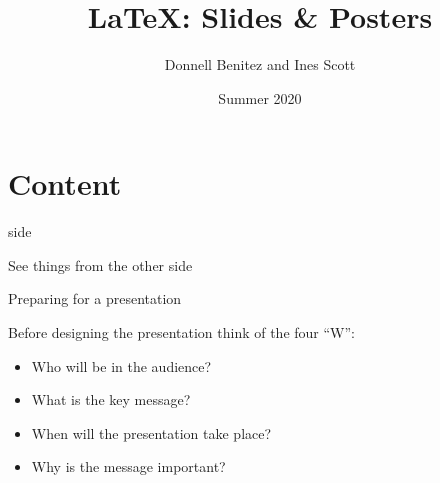
\usepackage{slideSFOCS}

\title{\LaTeX: Slides \& Posters}
\author{Donnell Benitez and Ines Scott}
\date{Summer 2020}

%
%

\newenvironment{framedd}[1][]{
	\setbeamertemplate{background}{\color{do}\rule{0.5\paperwidth}{\paperheight}\color{dont}\rule{0.5\paperwidth}{\paperheight}}
	\setslidecolor{fg=white,bg=do}
	\setbeamercolor{local structure}{fg=white}
	\begin{frame}[environment=framedd,#1]
		}{
	\end{frame}
}

\newcommand{\lcmd}[1]{{\tt \textbackslash #1}}




\maketitle

\mindtoc

\section{Content}

\begin{framef}{side}

	\pause
	\vspace{.225cm}
	\Huge \center See things from the other side
	
\end{framef}

\begin{frame}{Preparing for a presentation}

	Before designing the presentation think of the four ``W'':
	\begin{itemize}\bigsep
		\item \alert{W}ho will be in the audience?
		\item \alert{W}hat is the key message?
		\item \alert{W}hen will the presentation take place?
		\item \alert{W}hy is the message important?
	\end{itemize}

\end{frame}


